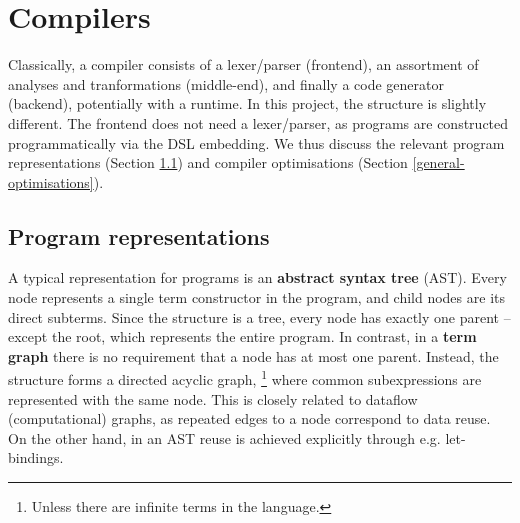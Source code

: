 

\section{Compilers}
\label{compiler-techniques}

Classically, a compiler consists of a lexer/parser (frontend), an assortment of analyses and tranformations (middle-end), and finally a code generator (backend), potentially with a runtime. In this project, the structure is slightly different. The frontend does not need a lexer/parser, as programs are constructed programmatically via the DSL embedding. We thus discuss the relevant program representations (Section \ref{representations}) and compiler optimisations (Section \ref{general-optimisations}).

\subsection{Program representations} \label{representations}

A typical representation for programs is an \textbf{abstract syntax tree} (AST). 
Every node represents a single term constructor in the program, and child nodes are its direct subterms. 
Since the structure is a tree, every node has exactly one parent -- except the root, which represents the entire program. 
In contrast, in a \textbf{term graph} there is no requirement that a node has at most one parent. 
Instead, the structure forms a directed acyclic graph,%
\footnote{Unless there are infinite terms in the language.
} where common subexpressions are represented with the same node. 
This is closely related to dataflow (computational) graphs, as repeated edges to a node correspond to data reuse. On the other hand, in an AST reuse is achieved explicitly through e.g. let-bindings.

